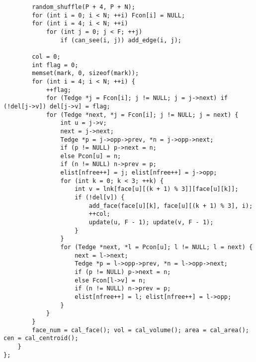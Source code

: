 \begin{verbatim}
        random_shuffle(P + 4, P + N);
        for (int i = 0; i < N; ++i) Fcon[i] = NULL;
        for (int i = 4; i < N; ++i)
            for (int j = 0; j < F; ++j)
                if (can_see(i, j)) add_edge(i, j);

        col = 0;
        int flag = 0;
        memset(mark, 0, sizeof(mark));
        for (int i = 4; i < N; ++i) {
            ++flag;
            for (Tedge *j = Fcon[i]; j != NULL; j = j->next) if (!del[j->v]) del[j->v] = flag;
            for (Tedge *next, *j = Fcon[i]; j != NULL; j = next) {
                int u = j->v;
                next = j->next;
                Tedge *p = j->opp->prev, *n = j->opp->next;
                if (p != NULL) p->next = n;
                else Pcon[u] = n;
                if (n != NULL) n->prev = p;
                elist[nfree++] = j; elist[nfree++] = j->opp;
                for (int k = 0; k < 3; ++k) {
                    int v = lnk[face[u][(k + 1) % 3]][face[u][k]];
                    if (!del[v]) {
                        add_face(face[u][k], face[u][(k + 1) % 3], i);
                        ++col;
                        update(u, F - 1); update(v, F - 1);
                    }
                }
                for (Tedge *next, *l = Pcon[u]; l != NULL; l = next) {
                    next = l->next;
                    Tedge *p = l->opp->prev, *n = l->opp->next;
                    if (p != NULL) p->next = n;
                    else Fcon[l->v] = n;
                    if (n != NULL) n->prev = p;
                    elist[nfree++] = l; elist[nfree++] = l->opp;
                }
            }
        }
        face_num = cal_face(); vol = cal_volume(); area = cal_area(); cen = cal_centroid();
    }
};
\end{verbatim}
